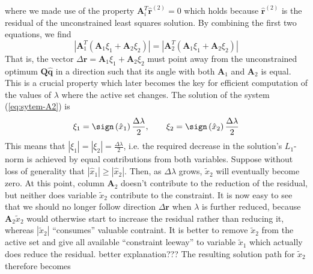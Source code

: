 where we made use of the property $\mathbf{A}_{i}^{T}\hat{\mathbf{r}}^{(2)}=0$
which holds because $\hat{\mathbf{r}}^{(2)}$ is the residual of the
unconstrained least squares solution. By combining the first two equations,
we find 
\begin{equation}
\left|\mathbf{A}_{1}^{T}\left(\mathbf{A}_{1}\xi_{1}+\mathbf{A}_{2}\xi_{2}\right)\right|=\left|\mathbf{A}_{2}^{T}\left(\mathbf{A}_{1}\xi_{1}+\mathbf{A}_{2}\xi_{2}\right)\right|\label{eq:equal-angle-A2}
\end{equation}
That is, the vector $\Delta\mathbf{r}=\mathbf{A}_{1}\xi_{1}+\mathbf{A}_{2}\xi_{2}$
must point away from the unconstrained optimum $\mathbf{Q}\mathbf{\hat{q}}$
in a direction such that its angle with both $\mathbf{A}_{1}$ and
$\mathbf{A}_{2}$ is equal. This is a crucial property which later
becomes the key for efficient computation of the values of $\lambda$
where the active set changes. The solution of the system (\ref{eq:sytem-A2})
is 
\begin{equation}
\xi_{1}=\sign\left(\hat{x}_{1}\right)\frac{\Delta\lambda}{2},\qquad\xi_{2}=\sign\left(\hat{x}_{2}\right)\frac{\Delta\lambda}{2}
\end{equation}
This means that $\left|\xi_{1}\right|=\left|\xi_{2}\right|=\frac{\Delta\lambda}{2}$,
i.e. the required decrease in the solution's $L_{1}$-norm is achieved
by equal contributions from both variables. Suppose without loss of
generality that $\left|\hat{x}_{1}\right|\ge\left|\hat{x}_{2}\right|$.
Then, as $\Delta\lambda$ grows, $\tilde{x}_{2}$ will eventually
become zero. At this point, column $\mathbf{A}_{2}$ doesn't contribute
to the reduction of the residual, but neither does variable $\tilde{x}_{2}$
contribute to the constraint. It is now easy to see that we should
no longer follow direction $\Delta\mathbf{r}$ when $\lambda$ is
further reduced, because $\mathbf{A}_{2}\tilde{x}_{2}$ would otherwise
start to increase the residual rather than reducing it, whereas $\left|\tilde{x}_{2}\right|$
``consumes'' valuable contraint. It is better to remove $\tilde{x}_{2}$
from the active set and give all available ``constraint leeway''
to variable $\tilde{x}_{1}$ which actually does reduce the residual.
better explanation??? The resulting solution path for $\tilde{x}_{2}$
therefore becomes


